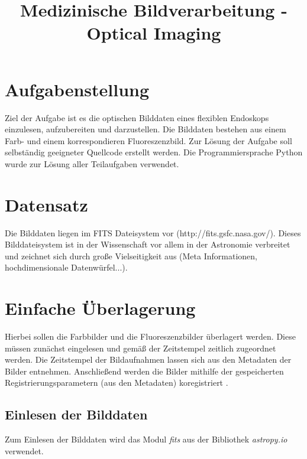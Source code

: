 \documentclass[conference]{IEEEtran}
\begin{document}
\title{Medizinische Bildverarbeitung - Optical Imaging}

\author{
}

\maketitle

\section{Aufgabenstellung}
Ziel der Aufgabe ist es die optischen Bilddaten eines flexiblen Endoskops einzulesen, aufzubereiten und darzustellen. Die Bilddaten bestehen aus einem Farb- und einem korrespondieren Fluoreszenzbild. Zur Lösung der Aufgabe soll selbständig geeigneter Quellcode erstellt werden. Die Programmiersprache Python wurde zur Lösung aller Teilaufgaben verwendet.

\section{Datensatz}
Die Bilddaten liegen im FITS Dateisystem vor (http://fits.gsfc.nasa.gov/). Dieses Bilddateisystem ist in der Wissenschaft vor allem in der Astronomie verbreitet und zeichnet sich durch große Vielseitigkeit aus (Meta Informationen, hochdimensionale Datenwürfel...).

\section{Einfache Überlagerung}
Hierbei sollen die Farbbilder und die Fluoreszenzbilder überlagert werden. Diese müssen zunächst eingelesen und gemäß der Zeitstempel zeitlich zugeordnet werden. Die Zeitstempel der Bildaufnahmen lassen sich aus den Metadaten der Bilder entnehmen. Anschließend werden die Bilder mithilfe der gespeicherten Registrierungsparametern (aus den Metadaten) koregistriert . 

\subsection{Einlesen der Bilddaten}
Zum Einlesen der Bilddaten wird das Modul \textit{fits} aus der Bibliothek \textit{astropy.io} verwendet.
\end{document}
